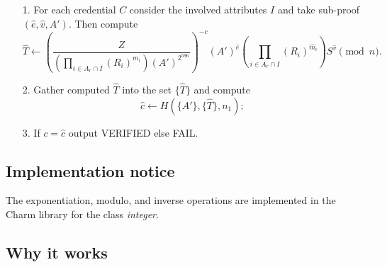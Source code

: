 \documentclass[a4paper]{article}
\begin{document}
\begin{enumerate}
\item[1.] For each credential $C$ consider the involved attributes $I$ and take sub-proof $(\widehat{e},\widehat{v},A')$. Then compute 
\begin{equation}\label{eq:that}
 \widehat{T} \leftarrow \left(
    \frac{Z}
    { \left(
        \prod_{i \in A_r\cap I}(R_i)^{m_i}
    \right)
    (A')^{2^{596}}
    }\right)^{-c}
    (A')^{\widehat{e}}
    \left(\prod_{i\in A_{\overline{r}}\cap I}(R_i)^{\widehat{m}_i}\right)
    S^{\widehat{v}}\pmod{n}.
\end{equation}
\item[2.] Gather computed $\widehat{T}$ into the set $\{\widehat{T}\}$ and compute $$
\widehat{c} \leftarrow H(\{A'\},\{\widehat{T}\},n_1);
$$
\item[3.] If $c=\widehat{c}$ output VERIFIED else FAIL.
\end{enumerate}

\subsection{Implementation notice}
The exponentiation, modulo, and inverse operations are implemented in the Charm library for the class \textsl{integer}.

\subsection{Why it works}
\end{document}
